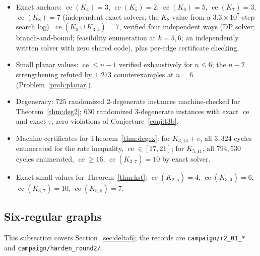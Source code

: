 \documentclass[a4paper,11pt]{amsart}
\theoremstyle{definition}
\theoremstyle{remark}
\newcommand{\ce}{\operatorname{ce}}
\begin{document}
\begin{itemize}
\item Exact anchors: $\ce(K_4)=3$, $\ce(K_5)=2$, $\ce(K_6)=5$, $\ce(K_7)=3$, $\ce(K_8)=7$ (independent
exact solvers; the $K_8$ value from a $3.3\times10^7$-step search log). $\ce(K_3\cup K_{3,4})=7$, verified
four independent ways (DP solver; branch-and-bound; feasibility enumeration at $k=5,6$; an independently
written solver with zero shared code), plus per-edge certificate checking.
\item Small planar values: $\ce\le n-1$ verified exhaustively for $n\le6$; the $n-2$ strengthening refuted
by $1{,}273$ counterexamples at $n=6$ (Problem~\ref{prob:planar}).
\item Degeneracy: $725$ randomized $2$-degenerate instances machine-checked for
Theorem~\ref{thm:deg2}; $630$ randomized $3$-degenerate instances with exact $\ce$ and exact $\tau$, zero
violations of Conjecture~\ref{conj:t3b}.
\item Machine certificates for Theorem~\ref{thm:degex}: for $K_{3,14}+e$, all $3{,}324$ cycles enumerated
for the rate inequality, $\ce\in[17,21]$; for $K_{5,11}$, all $794{,}530$ cycles enumerated, $\ce\ge16$;
$\ce(K_{3,7})=10$ by exact solver.
\item Exact small values for Theorem~\ref{thm:kst}: $\ce(K_{2,5})=4$, $\ce(K_{3,4})=6$, $\ce(K_{3,7})=10$,
$\ce(K_{5,5})=7$.
\end{itemize}

\subsection*{Six-regular graphs}

This subsection covers Section~\ref{sec:delta6}; the records are \texttt{campaign/r2\_01\_*} and
\texttt{campaign/harden\_round2/}.
\end{document}
